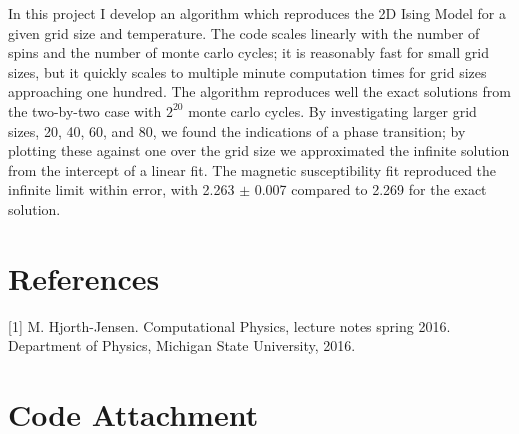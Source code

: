 \documentclass[11pt,a4paper]{article}
\begin{document}
In this project I develop an algorithm which reproduces the 2D Ising Model for a given grid size and temperature. The code scales linearly with the number of spins and the number of monte carlo cycles; it is reasonably fast for small grid sizes, but it quickly scales to multiple minute computation times for grid sizes approaching one hundred. The algorithm reproduces well the exact solutions from the two-by-two case with $2^{20}$ monte carlo cycles. By investigating larger grid sizes, 20, 40, 60, and 80, we found the indications of a phase transition; by plotting these against one over the grid size we approximated the infinite solution from the intercept of a linear fit. The magnetic susceptibility fit reproduced the infinite limit within error, with 2.263 $\pm$ 0.007 compared to 2.269 for the exact solution.

\section{References}

[1] M. Hjorth-Jensen. Computational Physics, lecture notes spring 2016. Department of Physics, Michigan State University, 2016. \newline

\newpage

\section*{Code Attachment}
\end{document}
